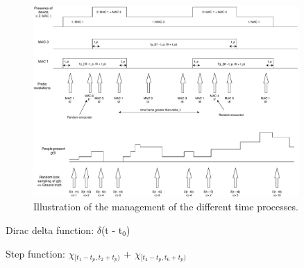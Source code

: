 \begin{figure}[h]
\centering 
\includegraphics[width=0.9\textwidth]{images/timeprocesses} 
\caption{Illustration of the management of the different time processes.}
\label{fig:timeprocesses}
\end{figure}

Dirac delta function:
$\delta$(t - t$_{0}$)

Step function:
$\chi$$_{[ t_{1} - t_{p}, t_{2} + t_{p} )}$ + $\chi$$_{[ t_{4} - t_{p}, t_{6} + t_{p} )}$
